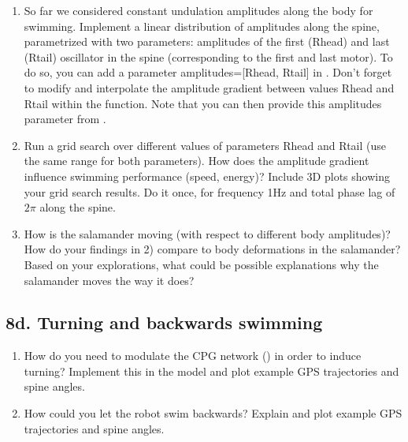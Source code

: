 \documentclass{cmc}
\begin{document}
\begin{enumerate}
\item So far we considered constant undulation amplitudes along the body for
  swimming. Implement a linear distribution of amplitudes along the spine,
  parametrized with two parameters: amplitudes of the first (Rhead) and last
  (Rtail) oscillator in the spine (corresponding to the first and last
  motor). To do so, you can add a parameter amplitudes=[Rhead, Rtail] in
  . Don't forget to modify
  \-
  and interpolate the amplitude gradient between values Rhead and Rtail within
  the function. Note that you can then provide this amplitudes parameter from
  .
\item Run a grid search over different values of parameters Rhead and Rtail (use
  the same range for both parameters). How does the amplitude gradient influence
  swimming performance (speed, energy)?  Include 3D plots showing your grid
  search results. Do it once, for frequency 1Hz and total phase lag of $2\pi$
  along the spine.
\item How is the salamander moving (with respect to different body amplitudes)?
  How do your findings in 2) compare to body deformations in the salamander?
  Based on your explorations, what could be possible explanations why the
  salamander moves the way it does?
\end{enumerate}


\subsection*{8d. Turning and backwards swimming}
\label{sec:turning-backwards}

\begin{enumerate}
\item How do you need to modulate the CPG network () in order
  to induce turning?  Implement this in the model and plot example GPS
  trajectories and spine angles.
\item How could you let the robot swim backwards? Explain and plot example GPS
  trajectories and spine angles.
\end{enumerate}


\end{document}
